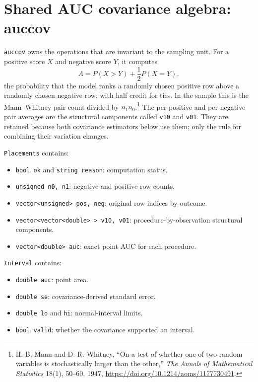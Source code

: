 \section{Shared AUC covariance algebra: auccov}\label{auccov_objects}

\texttt{auccov} owns the operations that are invariant to the sampling unit.
For a positive score $X$ and negative score $Y$, it computes
\begin{displaymath}
 A = P(X>Y) + \frac{1}{2}P(X=Y),
\end{displaymath}
the probability that the model ranks a randomly chosen positive row above a
randomly chosen negative row, with half credit for ties.  In the sample this is
the Mann--Whitney pair count divided by $n_1n_0$.\footnote{H. B. Mann and D. R.
Whitney, ``On a test of whether one of two random variables is stochastically
larger than the other,'' \emph{The Annals of Mathematical Statistics} 18(1),
50--60, 1947, \url{https://doi.org/10.1214/aoms/1177730491}.} The per-positive
and per-negative pair averages are the structural components called
\texttt{v10} and \texttt{v01}.  They are retained because both covariance
estimators below use them; only the rule for combining their variation changes.

\texttt{Placements} contains:

\begin{itemize}
\item \texttt{bool ok} and \texttt{string reason}: computation status.
\item \texttt{unsigned n0, n1}: negative and positive row counts.
\item \texttt{vector<unsigned> pos, neg}: original row indices by outcome.
\item \texttt{vector<vector<double> > v10, v01}: procedure-by-observation
      structural components.
\item \texttt{vector<double> auc}: exact point AUC for each procedure.
\end{itemize}

\texttt{Interval} contains:

\begin{itemize}
\item \texttt{double auc}: point area.
\item \texttt{double se}: covariance-derived standard error.
\item \texttt{double lo} and \texttt{hi}: normal-interval limits.
\item \texttt{bool valid}: whether the covariance supported an interval.
\end{itemize}

